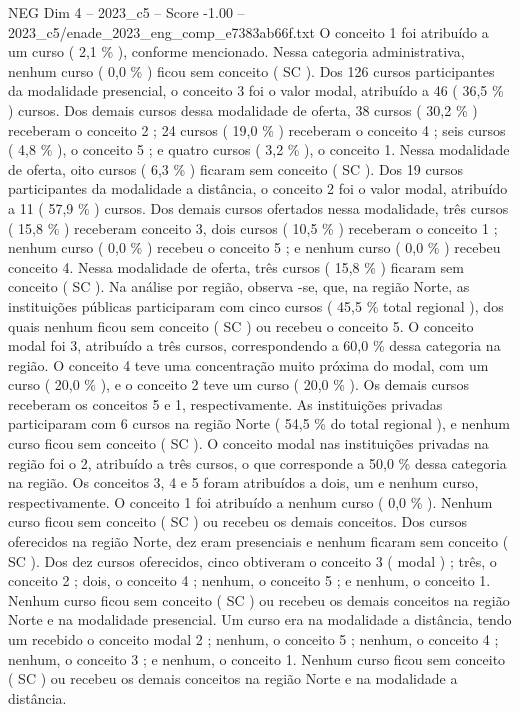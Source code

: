 \begin{textsample}{NEG Dim 4 – 2023\_c5 – Score -1.00 – 2023\_c5/enade\_2023\_eng\_comp\_e7383ab66f.txt}
O conceito 1 foi atribuído a um curso ( 2,1 \% ), conforme mencionado.
Nessa categoria administrativa, nenhum curso ( 0,0 \% ) ficou sem conceito ( SC ).
Dos 126 cursos participantes da modalidade presencial, o conceito 3 foi o valor modal, atribuído a 46 ( 36,5 \% ) cursos.
Dos demais cursos dessa modalidade de oferta, 38 cursos ( 30,2 \% ) receberam o conceito 2 ; 24 cursos ( 19,0 \% ) receberam o conceito 4 ; seis cursos ( 4,8 \% ), o conceito 5 ; e quatro cursos ( 3,2 \% ), o conceito 1.
Nessa modalidade de oferta, oito cursos ( 6,3 \% ) ficaram sem conceito ( SC ).
Dos 19 cursos participantes da modalidade a distância, o conceito 2 foi o valor modal, atribuído a 11 ( 57,9 \% ) cursos.
Dos demais cursos ofertados nessa modalidade, três cursos ( 15,8 \% ) receberam conceito 3, dois cursos ( 10,5 \% ) receberam o conceito 1 ; nenhum curso ( 0,0 \% ) recebeu o conceito 5 ; e nenhum curso ( 0,0 \% ) recebeu conceito 4.
Nessa modalidade de oferta, três cursos ( 15,8 \% ) ficaram sem conceito ( SC ).
Na análise por região, observa -se, que, na região Norte, as instituições públicas participaram com cinco cursos ( 45,5 \% total regional ), dos quais nenhum ficou sem conceito ( SC ) ou recebeu o conceito 5.
O conceito modal foi 3, atribuído a três cursos, correspondendo a 60,0 \% dessa categoria na região.
O conceito 4 teve uma concentração muito próxima do modal, com um curso ( 20,0 \% ), e o conceito 2 teve um curso ( 20,0 \% ).
Os demais cursos receberam os conceitos 5 e 1, respectivamente.
As instituições privadas participaram com 6 cursos na região Norte ( 54,5 \% do total regional ), e nenhum curso ficou sem conceito ( SC ).
O conceito modal nas instituições privadas na região foi o 2, atribuído a três cursos, o que corresponde a 50,0 \% dessa categoria na região.
Os conceitos 3, 4 e 5 foram atribuídos a dois, um e nenhum curso, respectivamente.
O conceito 1 foi atribuído a nenhum curso ( 0,0 \% ).
Nenhum curso ficou sem conceito ( SC ) ou recebeu os demais conceitos.
Dos cursos oferecidos na região Norte, dez eram presenciais e nenhum ficaram sem conceito ( SC ).
Dos dez cursos oferecidos, cinco obtiveram o conceito 3 ( modal ) ; três, o conceito 2 ; dois, o conceito 4 ; nenhum, o conceito 5 ; e nenhum, o conceito 1.
Nenhum curso ficou sem conceito ( SC ) ou recebeu os demais conceitos na região Norte e na modalidade presencial.
Um curso era na modalidade a distância, tendo um recebido o conceito modal 2 ; nenhum, o conceito 5 ; nenhum, o conceito 4 ; nenhum, o conceito 3 ; e nenhum, o conceito 1.
Nenhum curso ficou sem conceito ( SC ) ou recebeu os demais conceitos na região Norte e na modalidade a distância.

\end{textsample}
